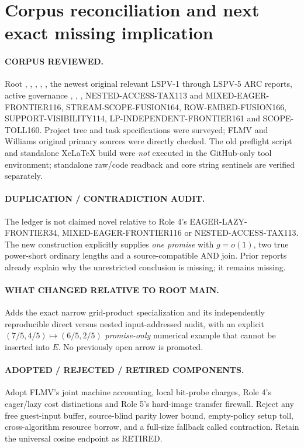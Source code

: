 \documentclass[11pt]{article}
\begin{document}
\section{Corpus reconciliation and next exact missing implication}
\paragraph{CORPUS REVIEWED.}
Root , ,
, ,
,
the newest original relevant LSPV-1 through LSPV-5 ARC
reports, active governance
,
,
,
NESTED-ACCESS-TAX113 and MIXED-EAGER-FRONTIER116,
STREAM-SCOPE-FUSION164, ROW-EMBED-FUSION166,
SUPPORT-VISIBILITY114, LP-INDEPENDENT-FRONTIER161
and SCOPE-TOLL160. Project tree and task specifications
were surveyed; FLMV and Williams original primary sources
were directly checked. The old preflight script and
standalone XeLaTeX build were \emph{not} executed in the
GitHub-only tool environment; standalone raw/code
readback and core string sentinels are verified separately.

\paragraph{DUPLICATION / CONTRADICTION AUDIT.}
The ledger is not claimed novel relative to Role 4's
EAGER-LAZY-FRONTIER34, MIXED-EAGER-FRONTIER116 or
NESTED-ACCESS-TAX113. The new construction explicitly
supplies \emph{one promise} with \(g=o(1)\), two true
power-short ordinary lengths and a source-compatible
AND join. Prior reports already explain why the
unrestricted conclusion is missing; it remains missing.

\paragraph{WHAT CHANGED RELATIVE TO ROOT MAIN.}
Adds the exact narrow grid-product specialization
and its independently reproducible direct versus
nested input-addressed audit, with an explicit
\((7/5,4/5)\mapsto(6/5,2/5)\) \emph{promise-only}
numerical example that cannot be inserted into \(E\).
No previously open arrow is promoted.

\paragraph{ADOPTED / REJECTED / RETIRED COMPONENTS.}
Adopt FLMV's joint machine accounting, local bit-probe
charges, Role 4's eager/lazy cost distinctions and
Role 5's hard-image transfer firewall. Reject any
free guest-input buffer, source-blind parity lower bound,
empty-policy setup toll, cross-algorithm resource
borrow, and a full-size fallback called contraction.
Retain the universal cosine endpoint as RETIRED.
\end{document}
